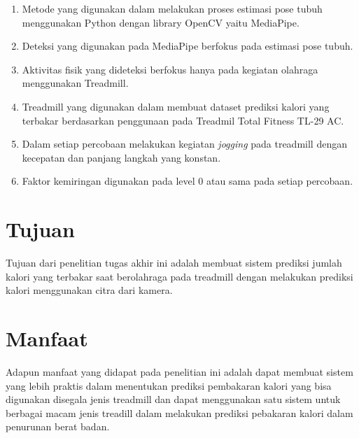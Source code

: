 \begin{enumerate}[nolistsep]

  \item Metode yang digunakan dalam melakukan proses estimasi pose tubuh menggunakan Python dengan library OpenCV yaitu MediaPipe.

  \item Deteksi yang digunakan pada MediaPipe berfokus pada estimasi pose tubuh.

  \item Aktivitas fisik yang dideteksi berfokus hanya pada kegiatan olahraga menggunakan Treadmill.

  \item Treadmill yang digunakan dalam membuat dataset prediksi kalori yang terbakar berdasarkan penggunaan pada Treadmil Total Fitness TL-29 AC.

  \item Dalam setiap percobaan melakukan kegiatan \emph{jogging} pada treadmill dengan kecepatan dan panjang langkah yang konstan.

  \item Faktor kemiringan digunakan pada level 0 atau sama pada setiap percobaan.

\end{enumerate}

\section{Tujuan}
\label{sec:Tujuan}

Tujuan dari penelitian tugas akhir ini adalah membuat sistem prediksi jumlah kalori yang terbakar saat berolahraga pada treadmill dengan melakukan prediksi kalori menggunakan citra dari kamera.


\section{Manfaat}

Adapun manfaat yang didapat pada penelitian ini adalah dapat membuat sistem yang lebih praktis dalam menentukan prediksi pembakaran kalori yang bisa digunakan disegala jenis treadmill dan dapat menggunakan satu sistem untuk berbagai macam jenis treadill dalam melakukan prediksi pebakaran kalori dalam penurunan berat badan.

